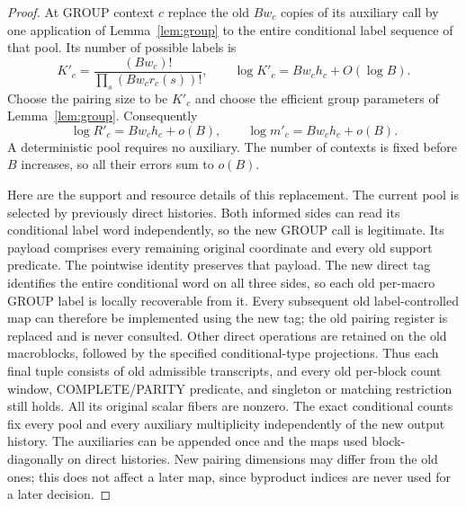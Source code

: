 \begin{proof}
At GROUP context $c$ replace the old $Bw_c$ copies of its auxiliary call by
one application of Lemma~\ref{lem:group} to the entire conditional label
sequence of that pool.  Its number of possible labels is
\[
 K'_c=\frac{(Bw_c)!}
           {\prod_s(Bw_cr_c(s))!},
 \qquad
 \log K'_c=Bw_ch_c+O(\log B).
\]
Choose the pairing size to be $K'_c$ and choose the efficient group parameters
of Lemma~\ref{lem:group}.  Consequently
\begin{equation}
 \log R'_c=Bw_ch_c+o(B),\qquad
 \log m'_c=Bw_ch_c+o(B).
\label{val:new-group-rates}
\end{equation}
A deterministic pool requires no auxiliary.  The number of contexts is
fixed before $B$ increases, so all their errors sum to $o(B)$.

Here are the support and resource details of this replacement.  The current
pool is selected by previously direct histories.  Both informed sides can
read its conditional label word independently, so the new GROUP call is
legitimate.  Its payload comprises every remaining original coordinate and
every old support predicate.  The pointwise identity preserves that payload.
The new direct tag identifies the entire conditional word on all three sides,
so each old per-macro GROUP label is locally recoverable from it.  Every
subsequent old label-controlled map can therefore be implemented using the
new tag; the old pairing register is replaced and is never consulted.
Other direct operations are retained on the old macroblocks, followed by the
specified conditional-type projections.  Thus each final tuple consists of
old admissible transcripts, and every old per-block count window,
COMPLETE/PARITY predicate, and singleton or matching restriction still holds.
All its original scalar fibers are nonzero.  The exact conditional counts
fix every pool and every auxiliary multiplicity independently of the new
output history.  The auxiliaries can be appended once and the maps used
block-diagonally on direct histories.  New pairing dimensions may differ
from the old ones; this does not affect a later map, since byproduct indices
are never used for a later decision.


\end{proof}
